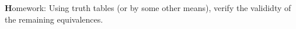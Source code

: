 \documentclass[11pt,paper=b5,footinclude,headinclude]{scrbook} %
\def\ali {{~\vee~}}
\def\inn {{~\wedge~}}
\def\cee {{~\Leftrightarrow~}}
\theoremstyle{remark}
\theoremstyle{definition} %
\begin{document}
{\textbf Homework:} Using truth tables (or by some other means), verify the valididty of the remaining equivalences.

\bigskip
\end{document}
